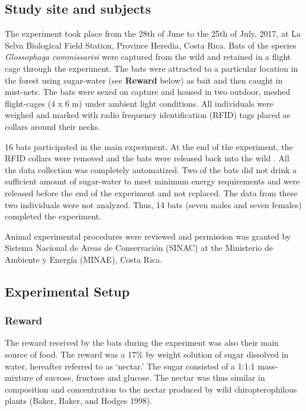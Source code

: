 \documentclass[
]{article}
\begin{document}
\hypertarget{study-site-and-subjects}{%
\subsection{Study site and subjects}\label{study-site-and-subjects}}

The experiment took place from the 28th of June to the 25th of July, 2017, at La Selva Biological Field Station, Province Heredia, Costa Rica. Bats of the species \emph{Glossophaga commissarisi} were captured from the wild and retained in a flight cage through the experiment. The bats were attracted to a particular location in the forest using sugar-water (see \textbf{Reward} below) as bait and then caught in mist-nets. The bats were sexed on capture and housed in two outdoor, meshed flight-cages (4 x 6 m) under ambient light conditions. All individuals were weighed and marked with radio frequency identification (RFID) tags placed as collars around their necks.

16 bats participated in the main experiment. At the end of the experiment, the RFID collars were removed and the bats were released back into the wild . All the data collection was completely automatized. Two of the bats did not drink a sufficient amount of sugar-water to meet minimum energy requirements and were released before the end of the experiment and not replaced. The data from these two individuals were not analyzed. Thus, 14 bats (seven males and seven females) completed the experiment.

Animal experimental procedures were reviewed and permission was granted by Sistema Nacional de Areas de Conservación (SINAC) at the Ministerio de Ambiente y Energía (MINAE), Costa Rica.

\hypertarget{experimental-setup}{%
\subsection{Experimental Setup}\label{experimental-setup}}

\hypertarget{reward}{%
\subsubsection{Reward}\label{reward}}

The reward received by the bats during the experiment was also their main source of food. The reward was a 17\% by weight solution of sugar dissolved in water, hereafter referred to as `nectar.' The sugar consisted of a 1:1:1 mass-mixture of sucrose, fructose and glucose. The nectar was thus similar in composition and concentration to the nectar produced by wild chiropterophilous plants (Baker, Baker, and Hodges 1998).
\end{document}
